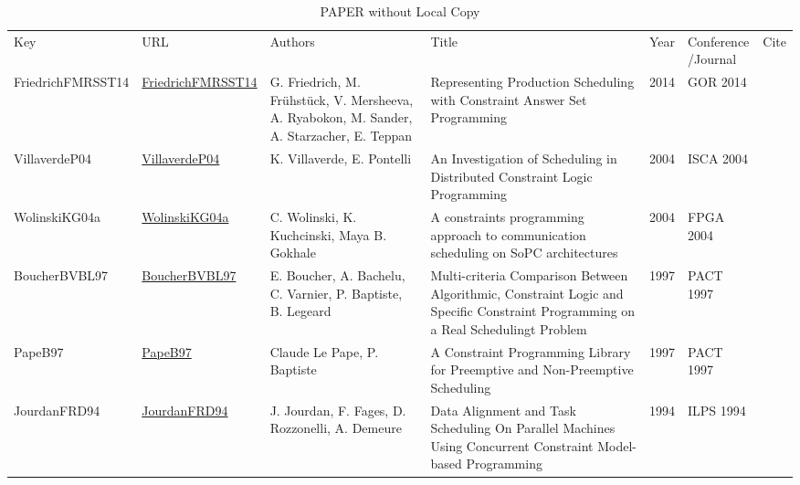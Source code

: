{\scriptsize
\begin{longtable}{llp{5cm}p{10cm}rp{3cm}l}
\rowcolor{white}\caption{PAPER without Local Copy}\\ \toprule
\rowcolor{white}Key & URL & Authors & Title & Year & \shortstack{Conference\\/Journal} & Cite\\ \midrule
\endhead
\bottomrule
\endfoot
FriedrichFMRSST14 & \href{https://doi.org/10.1007/978-3-319-28697-6\_23}{FriedrichFMRSST14} & G. Friedrich, M. Fr{\"{u}}hst{\"{u}}ck, V. Mersheeva, A. Ryabokon, M. Sander, A. Starzacher, E. Teppan & Representing Production Scheduling with Constraint Answer Set Programming & 2014 & GOR 2014 & \cite{FriedrichFMRSST14}\\VillaverdeP04 & \href{}{VillaverdeP04} & K. Villaverde, E. Pontelli & An Investigation of Scheduling in Distributed Constraint Logic Programming & 2004 & ISCA 2004 & \cite{VillaverdeP04}\\WolinskiKG04a & \href{https://doi.org/10.1145/968280.968336}{WolinskiKG04a} & C. Wolinski, K. Kuchcinski, Maya B. Gokhale & A constraints programming approach to communication scheduling on SoPC architectures & 2004 & FPGA 2004 & \cite{WolinskiKG04a}\\BoucherBVBL97 & \href{}{BoucherBVBL97} & E. Boucher, A. Bachelu, C. Varnier, P. Baptiste, B. Legeard & Multi-criteria Comparison Between Algorithmic, Constraint Logic and Specific Constraint Programming on a Real Schedulingt Problem & 1997 & PACT 1997 & \cite{BoucherBVBL97}\\PapeB97 & \href{}{PapeB97} & Claude Le Pape, P. Baptiste & A Constraint Programming Library for Preemptive and Non-Preemptive Scheduling & 1997 & PACT 1997 & \cite{PapeB97}\\JourdanFRD94 & \href{}{JourdanFRD94} & J. Jourdan, F. Fages, D. Rozzonelli, A. Demeure & Data Alignment and Task Scheduling On Parallel Machines Using Concurrent Constraint Model-based Programming & 1994 & ILPS 1994 & \cite{JourdanFRD94}\\\end{longtable}
}

